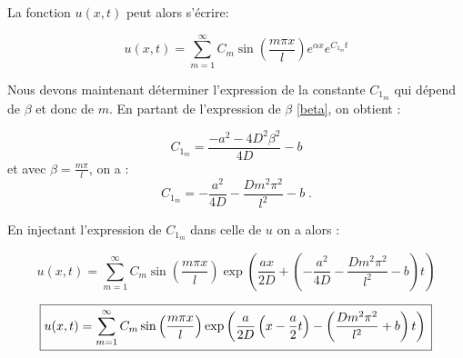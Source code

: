 \documentclass[a4paper, 12pt]{report}
\begin{document}





La fonction $u(x,t)$ peut alors s'écrire:

\begin{equation}
u(x,t) = \sum_{m=1}^{\infty} C_m \sin \left (\frac{m \pi x}{l} \right ) e^{\alpha x} e^{C_{1_m} t}
\end{equation}

Nous devons maintenant déterminer l'expression de la constante $C_{1_m}$ qui dépend de $\beta$ et donc de $m$. En partant de l'expression de $\beta$ \eqref{beta}, on obtient :

\begin{equation}
  C_{1_m}= \frac{-a^2 - 4D^{2}\beta^{2}}{4D}-b
\end{equation}
et avec $\beta = \frac{m \pi}{l}$, on a :
\begin{equation}
  C_{1_m}= - \frac{a^2}{4D} - \frac{D m^2 \pi^2}{l^2}-b\;.
\end{equation}

En injectant l'expression de $C_{1_m}$ dans celle de $u$ on a alors :

\begin{equation}
u(x,t) = \sum_{m=1}^{\infty} C_m \sin \left (\frac{m \pi x}{l} \right ) \exp \left ( \frac{a x}{2D} + \left ( - \frac{a^2}{4D} - \frac{D m^2 \pi^2}{l^2}-b \right ) t \right )
\end{equation}

\begin{equation}
  \boxed{u(x,t) = \sum_{m=1}^{\infty} C_m \sin \left (\frac{m \pi x}{l} \right ) \exp \left ( \frac{a}{2D} \left (x - \frac{a}{2} t \right ) - \left (\frac{D m^2 \pi^2}{l^2}+b \right ) t \right )\\
}
\label{eq:analy_sol}
\end{equation}
\end{document}
